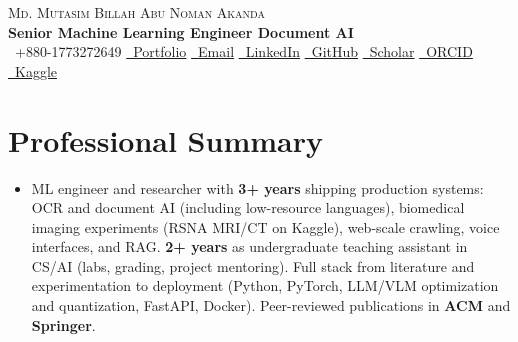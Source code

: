 \documentclass[a4paper,11pt]{article}
\newcommand{\resumeItem}[2]{
  \item\small{
    \textbf{#1}{: #2 \vspace{-2pt}}
  }
}
\newcommand{\resumeSubItem}[2]{\resumeItem{#1}{#2}\vspace{-3pt}}
\newcommand{\resumeSubHeadingListStart}{\begin{itemize}[leftmargin=*]}
\newcommand{\resumeSubHeadingListEnd}{\end{itemize}}
\begin{document}
\begin{center}
    {\LARGE \textsc{Md. Mutasim Billah Abu Noman Akanda}} \\ \vspace{4pt}
    {\small \textbf{Senior Machine Learning Engineer \textbullet{} Document AI}} \\ \vspace{4pt}
    \footnotesize
    \faPhone\ +880-1773272649 \quad
    \href{https://noman024.github.io/}{\faGlobe\ Portfolio} \quad
    \href{mailto:mutasim.billah024@gmail.com}{\faEnvelope\ Email} \quad
    \href{https://www.linkedin.com/in/noman024/}{\faLinkedin\ LinkedIn} \quad
    \href{https://github.com/noman024}{\faGithub\ GitHub} \quad
    \href{https://scholar.google.com/citations?user=kR2bOWMAAAAJ}{\faGlobe\ Scholar} \quad
    \href{https://orcid.org/0009-0006-4981-7822}{\faGlobe\ ORCID} \quad
    \href{https://www.kaggle.com/mutasimbillahnoman}{\faGlobe\ Kaggle}
\end{center}

\section{Professional Summary}
\resumeSubHeadingListStart
\item[] \small
ML engineer and researcher with \textbf{3+ years} shipping production systems: OCR and document AI (including low-resource languages), biomedical imaging experiments (RSNA MRI/CT on Kaggle), web-scale crawling, voice interfaces, and RAG. \textbf{2+ years} as undergraduate teaching assistant in CS/AI (labs, grading, project mentoring). Full stack from literature and experimentation to deployment (Python, PyTorch, LLM/VLM optimization and quantization, FastAPI, Docker). Peer-reviewed publications in \textbf{ACM} and \textbf{Springer}.
\resumeSubHeadingListEnd

\end{document}
